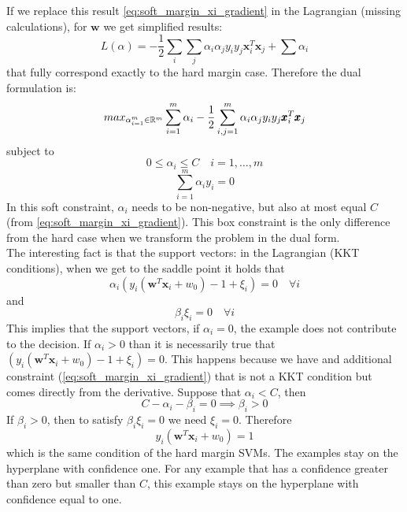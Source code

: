    If we replace this result \ref{eq:soft_margin_xi_gradient} in the Lagrangian (missing calculations), for $\pmb{w}$ we get simplified results:
    $$L(\alpha) =  -\frac{1}{2} \sum_{i}\sum_{j} \alpha_i \alpha_j y_i y_j \pmb{x}_i^T \pmb{x}_j + \sum \alpha_i$$
    that fully correspond exactly to the hard margin case. 
    Therefore the dual formulation is:
    \begin{equation}
        max_{\alpha_{i=1}^m \in \mathbb{R} ^m} \sum_{i=1}^m \alpha_i - \frac{1}{2} \sum_{i, j = 1} ^m \alpha_i \alpha_j y_i y_j \pmb{x}_i^T \pmb{x}_j
        \label{eq:dual_formulation_object_soft}
    \end{equation}
    subject to 
    $$0 \leq \alpha_i \leq C \quad i = 1, \dots, m$$
    $$\sum_{i=1}^m \alpha_i y_i = 0$$
    In this soft constraint, $\alpha_i$ needs to be non-negative, but also at most equal $C$ (from \ref{eq:soft_margin_xi_gradient}). 
    This box constraint is the only difference from the hard case when we transform the problem in the dual form.\\

    The interesting fact is that the support vectors:
    in the Lagrangian (KKT conditions), when we get to the saddle point it holds that 
    $$\alpha_i(y_i (\pmb{w}^T \pmb{x}_i + w_0) - 1 + \xi_i) = 0 \quad \forall i$$
    and
    $$\beta_i\xi_i = 0 \quad \forall i$$
    This implies that the support vectors, if $\alpha_i = 0$, the example does not contribute to the decision. 
    If $\alpha_i > 0$ than it is necessarily true that $(y_i (\pmb{w}^T \pmb{x}_i + w_0) - 1 + \xi_i) = 0$. 
    This happens because we have and additional constraint (\ref{eq:soft_margin_xi_gradient}) that is not a KKT condition but comes directly from the derivative. 
    Suppose that $\alpha_i < C$, then 
    $$C - \alpha_i - \beta_i = 0 \implies \beta_i > 0$$
    If $\beta_i > 0$, then to satisfy $\beta_i\xi_i = 0$ we need $\xi_i = 0$. 
    Therefore 
    $$y_i (\pmb{w}^T \pmb{x}_i + w_0) = 1 $$
    which is the same condition of the hard margin SVMs. The examples stay on the hyperplane with confidence one.
    For any example that has a confidence greater than zero but smaller than $C$, this example stays on the hyperplane with confidence equal to one. \\

